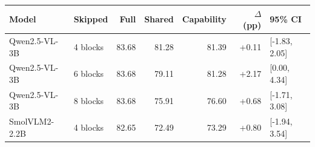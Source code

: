 \begin{tabular}{llrrrrl}
\toprule
Model & Skipped & Full & Shared & Capability & $\Delta$ (pp) & 95\% CI \\
\midrule
Qwen2.5-VL-3B & 4 blocks & 83.68 & 81.28 & 81.39 & +0.11 & [-1.83, 2.05] \\
Qwen2.5-VL-3B & 6 blocks & 83.68 & 79.11 & 81.28 & +2.17 & [0.00, 4.34] \\
Qwen2.5-VL-3B & 8 blocks & 83.68 & 75.91 & 76.60 & +0.68 & [-1.71, 3.08] \\
SmolVLM2-2.2B & 4 blocks & 82.65 & 72.49 & 73.29 & +0.80 & [-1.94, 3.54] \\
\bottomrule
\end{tabular}
